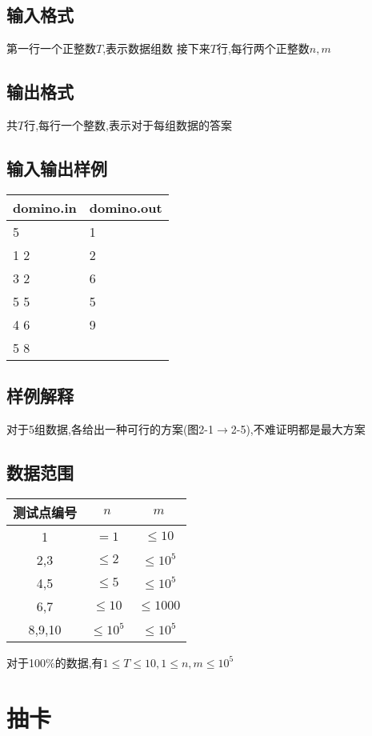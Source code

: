 \documentclass[12pt]{ctexart}
\begin{document}
\subsection{输入格式}
第一行一个正整数$T$,表示数据组数
接下来$T$行,每行两个正整数$n,m$
\subsection{输出格式}
共$T$行,每行一个整数,表示对于每组数据的答案
\subsection{输入输出样例}
\begin{center}
	\begin{tabular}{|p{6cm}|p{6cm}|}
		\hline domino.in&domino.out\\
		\hline	5&1\\
				1 2&2\\
				3 2&6\\
				5 5&5\\
				4 6&9\\
				5 8&\\
		\hline
	\end{tabular}
\end{center}
\subsection{样例解释}
对于5组数据,各给出一种可行的方案(图2-1$\to$2-5),不难证明都是最大方案
\subsection{数据范围}
\begin{center}
	\begin{tabular}{|c|c|c|}
		\hline 测试点编号&$n$&$m$\\
		\hline 1&$=1$&$\le10$\\
		\hline 2,3&$\le2$&$\le10^5$\\
		\hline 4,5&$\le5$&$\le10^5$\\
		\hline 6,7&$\le10$&$\le1000$\\
		\hline 8,9,10&$\le10^5$&$\le10^5$\\
		\hline
	\end{tabular}
\end{center}
对于100\%的数据,有$1\le T\le10,1\le n,m\le10^5$
\newpage
\section{抽卡}
\end{document}
